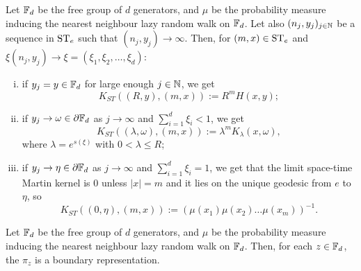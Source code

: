 \documentclass[12pt, class = article, crop = false, a4paper, twoside]{standalone}
\begin{document}
\begin{theorem}

    Let $\mathbb{F}_{d}$ be the free group of $d$ generators, and $\mu$ be the probability measure inducing the nearest neighbour lazy random walk on $\mathbb{F}_{d}$. Let also $(n_{j}, y_{j})_{j\in\mathbb{N}}$ be a sequence in $\operatorname{ST}_{e}$ such that $(n_{j}, y_{j})\to\infty$. Then, for $(m, x)\in\operatorname{ST}_{e}$ and $\xi(n_{j}, y_{j})\to\xi = (\xi_{1}, \xi_{2}, \dots, \xi_{d})$:
    \begin{enumerate}[(i)]
        \item if $y_{j} = y\in\mathbb{F}_{d}$ for large enough $j\in\mathbb{N}$, we get
        \begin{equation*}
            K_{ST}((R, y), (m, x)) := R^{m}H(x, y);  
        \end{equation*}
        \item if $y_{j}\to\omega\in\partial \mathbb{F}_{d}$ as $j\to\infty$ and $\sum^{d}_{i = 1}\xi_{i} < 1$, we get
        \begin{equation*}
            K_{ST}((\lambda, \omega), (m, x)) := \lambda^{m}K_{\lambda}(x, \omega),
        \end{equation*}
        where $\lambda = e^{s(\xi)}$ with $0 < \lambda \leq R$;
        \item if $y_{j}\to\eta\in\partial \mathbb{F}_{d}$ as $j\to\infty$ and $\sum^{d}_{i = 1}\xi_{i} = 1$, we get that the limit space-time Martin kernel is $0$ unless $|x| = m$ and it lies on the unique geodesic from $e$ to $\eta$, so
        \begin{equation*}
            K_{ST}((0, \eta), (m, x)) := (\mu(x_{1})\mu(x_{2})\dots\mu(x_{m}))^{-1}.
        \end{equation*}
    \end{enumerate}
\end{theorem}

\begin{proposition}

    Let $\mathbb{F}_{d}$ be the free group of $d$ generators, and $\mu$ be the probability measure inducing the nearest neighbour lazy random walk on $\mathbb{F}_{d}$. Then, for each $z\in\mathbb{F}_{d}$, the $\pi_{z}$ is a boundary representation.
\end{proposition}
\end{document}
